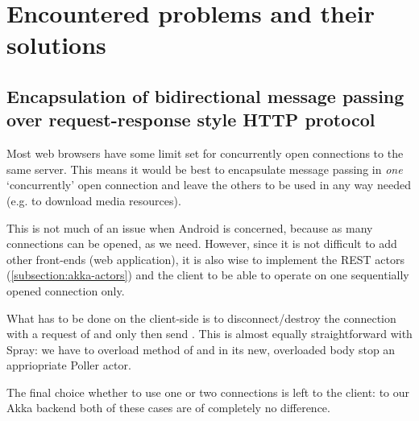%
%
%
%
%

\section{Encountered problems and their solutions}
\label{sec:impl-problems}

\subsection{Encapsulation of bidirectional message passing over request-response style HTTP protocol}
\label{subsec:problem-longpolling}

Most web browsers have some limit set for concurrently open connections to the same server. This means it would be best to encapsulate message passing in \emph{one} `concurrently' open connection and leave the others to be used in any way needed (e.g. to download media resources).

This is not much of an issue when Android is concerned, because as many connections can be opened, as we need. However, since it is not difficult to add other front-ends (web application), it is also wise to implement the REST actors (\cref{subsection:akka-actors}) and the client to be able to operate on one sequentially opened connection only.

What has to be done on the client-side is to disconnect/destroy the connection with a request of  and only then send . This is almost equally straightforward with Spray: we have to overload  method of  and in its new, overloaded body stop an appriopriate Poller actor.

The final choice whether to use one or two connections is left to the client: to our Akka backend both of these cases are of completely no difference.

